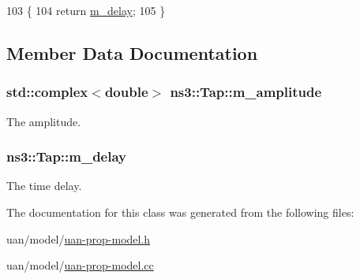 \begin{DoxyCode}
103 \{
104   \textcolor{keywordflow}{return} \hyperlink{classns3_1_1Tap_a2f88ee3cb0d67aea7e569e51d45a8a53}{m\_delay};
105 \}
\end{DoxyCode}


\subsection{Member Data Documentation}
\subsubsection[{\texorpdfstring{m\+\_\+amplitude}{m_amplitude}}]{\setlength{\rightskip}{0pt plus 5cm}std\+::complex$<$double$>$ ns3\+::\+Tap\+::m\+\_\+amplitude\hspace{0.3cm}{\ttfamily [private]}}\hypertarget{classns3_1_1Tap_ae51d0f136739f2803e527c86834f0a3b}{}\label{classns3_1_1Tap_ae51d0f136739f2803e527c86834f0a3b}


The amplitude. 

\subsubsection[{\texorpdfstring{m\+\_\+delay}{m_delay}}]{ ns3\+::\+Tap\+::m\+\_\+delay\hspace{0.3cm}{\ttfamily [private]}}\hypertarget{classns3_1_1Tap_a2f88ee3cb0d67aea7e569e51d45a8a53}{}\label{classns3_1_1Tap_a2f88ee3cb0d67aea7e569e51d45a8a53}


The time delay. 



The documentation for this class was generated from the following files\+:\begin{DoxyCompactItemize}
\item 
uan/model/\hyperlink{uan-prop-model_8h}{uan-\/prop-\/model.\+h}\item 
uan/model/\hyperlink{uan-prop-model_8cc}{uan-\/prop-\/model.\+cc}\end{DoxyCompactItemize}
